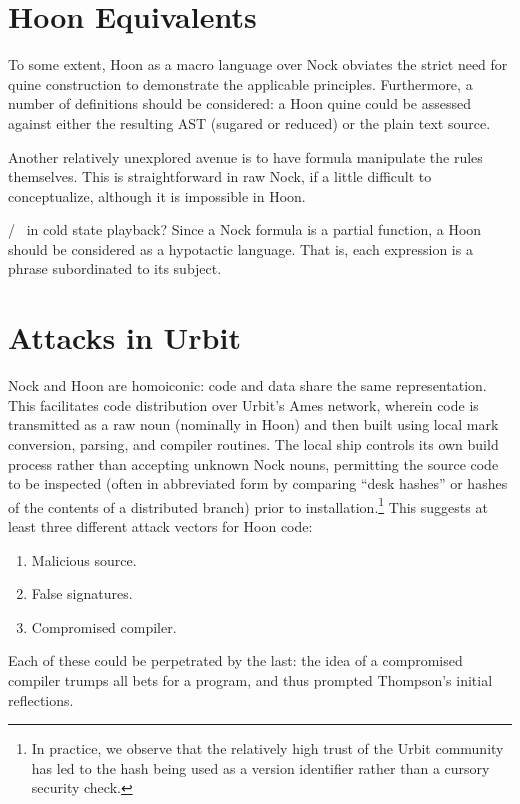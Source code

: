 \documentclass[twoside]{article}
\begin{document}
\section{Hoon Equivalents}

To some extent, Hoon as a macro language over Nock obviates the strict need for quine construction to demonstrate the applicable principles.  Furthermore, a number of definitions should be considered:  a Hoon quine could be assessed against either the resulting AST (sugared or reduced) or the plain text source.


Another relatively unexplored avenue is to have formula manipulate the rules themselves.  This is straightforward in raw Nock, if a little difficult to conceptualize, although it is impossible in Hoon.

/~ in cold state playback?
Since a Nock formula is a partial function, a Hoon should be considered as a hypotactic language.  That is, each expression is a phrase subordinated to its subject.


\section{Attacks in Urbit}

Nock and Hoon are homoiconic:  code and data share the same representation.  This facilitates code distribution over Urbit's Ames network, wherein code is transmitted as a raw noun (nominally in Hoon) and then built using local mark conversion, parsing, and compiler routines.  The local ship controls its own build process rather than accepting unknown Nock nouns, permitting the source code to be inspected (often in abbreviated form by comparing “desk hashes” or hashes of the contents of a distributed branch) prior to installation.\footnote{In practice, we observe that the relatively high trust of the Urbit community has led to the hash being used as a version identifier rather than a cursory security check.}  This suggests at least three different attack vectors for Hoon code:

\begin{enumerate}
  \item  Malicious source.
  \item  False signatures.
  \item  Compromised compiler.
\end{enumerate}

\noindent
Each of these could be perpetrated by the last:  the idea of a compromised compiler trumps all bets for a program, and thus prompted Thompson's initial reflections.
\end{document}
